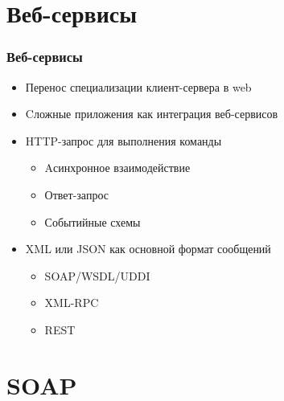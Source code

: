 \documentclass[xetex,mathserif,serif]{beamer}
\begin{document}
	\section{Веб-сервисы}

	\begin{frame}
		\frametitle{Веб-сервисы}
		\begin{itemize}
			\item Перенос специализации клиент-сервера в web
			\item Cложные приложения как интеграция веб-сервисов
			\item HTTP-запрос для выполнения команды
			\begin{itemize}
				\item Aсинхронное взаимодействие
				\item Ответ-запрос
				\item Событийные схемы
			\end{itemize}
			\item XML или JSON как основной формат сообщений
			\begin{itemize}
				\item SOAP/WSDL/UDDI
				\item XML-RPC
				\item REST
			\end{itemize}
		\end{itemize}
	\end{frame}

	\section{SOAP}
\end{document}

